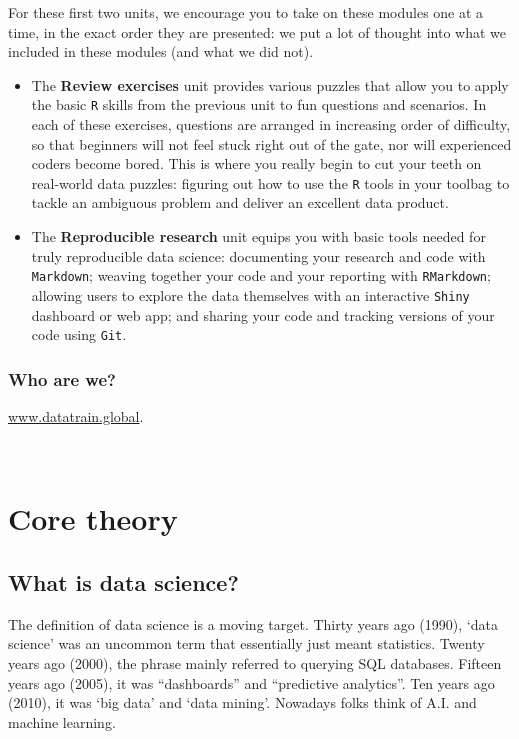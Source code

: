 \documentclass[
]{book}
\begin{document}
For these first two units, we encourage you to take on these modules one at a time, in the exact order they are presented: we put a lot of thought into what we included in these modules (and what we did not).

\begin{itemize}
\item
  The \textbf{Review exercises} unit provides various puzzles that allow you to apply the basic \texttt{R} skills from the previous unit to fun questions and scenarios. In each of these exercises, questions are arranged in increasing order of difficulty, so that beginners will not feel stuck right out of the gate, nor will experienced coders become bored. This is where you really begin to cut your teeth on real-world data puzzles: figuring out how to use the \texttt{R} tools in your toolbag to tackle an ambiguous problem and deliver an excellent data product.
\item
  The \textbf{Reproducible research} unit equips you with basic tools needed for truly reproducible data science: documenting your research and code with \texttt{Markdown}; weaving together your code and your reporting with \texttt{RMarkdown};
  allowing users to explore the data themselves with an interactive \texttt{Shiny} dashboard or web app; and sharing your code and tracking versions of your code using \texttt{Git}.
\end{itemize}

\hypertarget{who-are-we}{%
\section*{Who are we?}\label{who-are-we}}

\href{https://datatrain.global}{www.datatrain.global}.

~

\hypertarget{part-core-theory}{%
\part{Core theory}\label{part-core-theory}}

\hypertarget{what-is-data-science}{%
\chapter{What is data science?}\label{what-is-data-science}}

The definition of data science is a moving target. Thirty years ago (1990), `data science' was an uncommon term that essentially just meant statistics. Twenty years ago (2000), the phrase mainly referred to querying SQL databases. Fifteen years ago (2005), it was ``dashboards'' and ``predictive analytics''. Ten years ago (2010), it was `big data' and `data mining'. Nowadays folks think of A.I. and machine learning.
\end{document}
